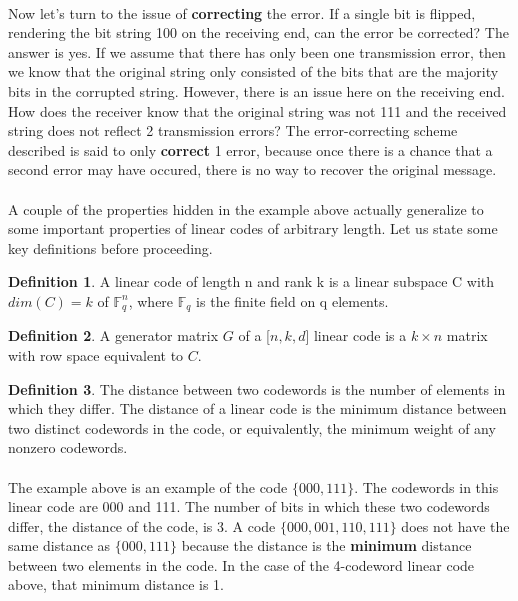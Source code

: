 \documentclass[12pt]{article}
\theoremstyle{definition}
\newtheorem{definition}{Definition}[section]
\begin{document}
\paragraph{} Now let's turn to the issue of \textbf{correcting} the error.  If a single bit is flipped, rendering the bit string 100 on the receiving end, can the error be corrected?  The answer is yes.  If we assume that there has only been one transmission error, then we know that the original string only consisted of the bits that are the majority bits in the corrupted string.  However, there is an issue here on the receiving end.  How does the receiver know that the original string was not 111 and the received string does not reflect 2 transmission errors?  The error-correcting scheme described is said to only \textbf{correct} 1 error, because once there is a chance that a second error may have occured, there is no way to recover the original message. 
\paragraph{} A couple of the properties hidden in the example above actually generalize to some important properties of linear codes of arbitrary length.  Let us state some key definitions before proceeding.        

\begin{definition}
A linear code of length n and rank k is a linear subspace C with $dim(C)=k$ of $\mathbb{F}_{q}^{n}$, where $\mathbb{F}_{q}$ is the finite field on q elements. 
\end{definition}	
\begin{definition}
A generator matrix $G$ of a [$n,k,d$] linear code is a $k \times n$ matrix with row space equivalent to $C$.
\end{definition}
\begin{definition}
The distance between two codewords is the number of elements in which they differ.  The distance of a linear code is the minimum distance between two distinct codewords in the code, or equivalently, the minimum weight of any nonzero codewords.
\end{definition}

\paragraph{} The example above is an example of the code $\{000,111\}$.  The codewords in this linear code are 000 and 111.  The number of bits in which these two codewords differ, the distance of the code, is 3.  A code $\{000,001,110,111\}$ does not have the same distance as $\{000,111\}$ because the distance is the \textbf{minimum} distance between two elements in the code.  In the case of the 4-codeword linear code above, that minimum distance is 1.  
\end{document}

